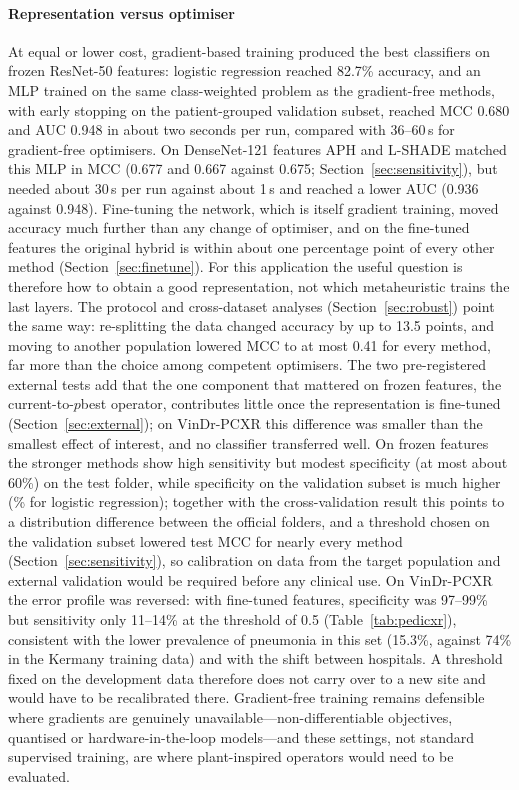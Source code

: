 \documentclass[preprint,12pt]{elsarticle}
\begin{document}
\paragraph{Representation versus optimiser} At equal or lower cost, gradient-based training produced the best classifiers on frozen ResNet-50 features: logistic regression reached 82.7\% accuracy, and an MLP trained on the same class-weighted problem as the gradient-free methods, with early stopping on the patient-grouped validation subset, reached MCC 0.680 and AUC 0.948 in about two seconds per run, compared with 36--60\,s for gradient-free optimisers. On DenseNet-121 features APH and L-SHADE matched this MLP in MCC (0.677 and 0.667 against 0.675; Section~\ref{sec:sensitivity}), but needed about 30\,s per run against about 1\,s and reached a lower AUC (0.936 against 0.948). Fine-tuning the network, which is itself gradient training, moved accuracy much further than any change of optimiser, and on the fine-tuned features the original hybrid is within about one percentage point of every other method (Section~\ref{sec:finetune}). For this application the useful question is therefore how to obtain a good representation, not which metaheuristic trains the last layers. The protocol and cross-dataset analyses (Section~\ref{sec:robust}) point the same way: re-splitting the data changed accuracy by up to 13.5 points, and moving to another population lowered MCC to at most 0.41 for every method, far more than the choice among competent optimisers. The two pre-registered external tests add that the one component that mattered on frozen features, the current-to-$p$best operator, contributes little once the representation is fine-tuned (Section~\ref{sec:external}); on VinDr-PCXR this difference was smaller than the smallest effect of interest, and no classifier transferred well. On frozen features the stronger methods show high sensitivity but modest specificity (at most about 60\%) on the test folder, while specificity on the validation subset is much higher (\LRValSpec\% for logistic regression); together with the cross-validation result this points to a distribution difference between the official folders, and a threshold chosen on the validation subset lowered test MCC for nearly every method (Section~\ref{sec:sensitivity}), so calibration on data from the target population and external validation would be required before any clinical use. On VinDr-PCXR the error profile was reversed: with fine-tuned features, specificity was 97--99\% but sensitivity only 11--14\% at the threshold of 0.5 (Table~\ref{tab:pedicxr}), consistent with the lower prevalence of pneumonia in this set (15.3\%, against 74\% in the Kermany training data) and with the shift between hospitals. A threshold fixed on the development data therefore does not carry over to a new site and would have to be recalibrated there. Gradient-free training remains defensible where gradients are genuinely unavailable---non-differentiable objectives, quantised or hardware-in-the-loop models---and these settings, not standard supervised training, are where plant-inspired operators would need to be evaluated.
\end{document}
